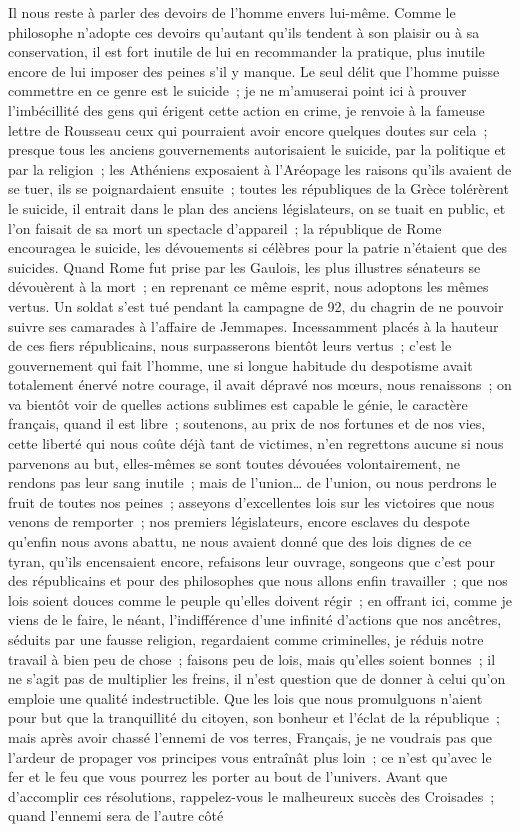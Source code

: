 \documentclass[french,twoside]{book} %
\begin{document}
Il nous reste à parler des devoirs de l’homme envers lui-même. Comme le philosophe n’adopte ces devoirs qu’autant qu’ils tendent à son plaisir ou à sa conservation, il est fort inutile de lui en recommander la pratique, plus inutile encore de lui imposer des peines s’il y manque. Le seul délit que l’homme puisse commettre en ce genre est le suicide ; je ne m’amuserai point ici à prouver l’imbécillité des gens qui érigent cette action en crime, je renvoie à la fameuse lettre de Rousseau ceux qui pourraient avoir encore quelques doutes sur cela ; presque tous les anciens gouvernements autorisaient le suicide, par la politique et par la religion ; les Athéniens exposaient à l’Aréopage les raisons qu’ils avaient de se tuer, ils se poignardaient ensuite ; toutes les républiques de la Grèce tolérèrent le suicide, il entrait dans le plan des anciens législateurs, on se tuait en public, et l’on faisait de sa mort un spectacle d’appareil ; la république de Rome encouragea le suicide, les dévouements si célèbres pour la patrie n’étaient que des suicides. Quand Rome fut prise par les Gaulois, les plus illustres sénateurs se dévouèrent à la mort ; en reprenant ce même esprit, nous adoptons les mêmes vertus. Un soldat s’est tué pendant la campagne de 92, du chagrin de ne pouvoir suivre ses camarades à l’affaire de Jemmapes. Incessamment placés à la hauteur de ces fiers républicains, nous surpasserons bientôt leurs vertus ; c’est le gouvernement qui fait l’homme, une si longue habitude du despotisme avait totalement énervé notre courage, il avait dépravé nos mœurs, nous renaissons ; on va bientôt voir de quelles actions sublimes est capable le génie, le caractère français, quand il est libre ; soutenons, au prix de nos fortunes et de nos vies, cette liberté qui nous coûte déjà tant de victimes, n’en regrettons aucune si nous parvenons au but, elles-mêmes se sont toutes dévouées volontairement, ne rendons pas leur sang inutile ; mais de l’union… de l’union, ou nous perdrons le fruit de toutes nos peines ; asseyons d’excellentes lois sur les victoires que nous venons de remporter ; nos premiers législateurs, encore esclaves du despote qu’enfin nous avons abattu, ne nous avaient donné que des lois dignes de ce tyran, qu’ils encensaient encore, refaisons leur ouvrage, songeons que c’est pour des républicains et pour des philosophes que nous allons enfin travailler ; que nos lois soient douces comme le peuple qu’elles doivent régir ; en offrant ici, comme je viens de le faire, le néant, l’indifférence d’une infinité d’actions que nos ancêtres, séduits par une fausse religion, regardaient comme criminelles, je réduis notre travail à bien peu de chose ; faisons peu de lois, mais qu’elles soient bonnes ; il ne s’agit pas de multiplier les freins, il n’est question que de donner à celui qu’on emploie une qualité indestructible. Que les lois que nous promulguons n’aient pour but que la tranquillité du citoyen, son bonheur et l’éclat de la république ; mais après avoir chassé l’ennemi de vos terres, Français, je ne voudrais pas que l’ardeur de propager vos principes vous entraînât plus loin ; ce n’est qu’avec le fer et le feu que vous pourrez les porter au bout de l’univers. Avant que d’accomplir ces résolutions, rappelez-vous le malheureux succès des Croisades ; quand l’ennemi sera de l’autre côté 
\end{document}
